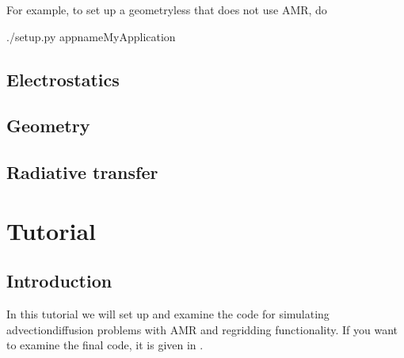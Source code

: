 \documentclass[letterpaper,10pt,english]{sphinxmanual}
\begin{document}
\sphinxAtStartPar
For example, to set up a geometry\sphinxhyphen{}less that does not use AMR, do

\begin{sphinxVerbatim}[commandchars=\\\{\},formatcom=\scriptsize]
 
./setup.py \PYGZhy{}app\PYGZus{}nameMyApplication
\end{sphinxVerbatim}

\sphinxstepscope


\section{Electrostatics}
\label{\detokenize{Applications/ElectrostaticsModel:electrostatics}}\label{\detokenize{Applications/ElectrostaticsModel:chap-electrostaticsmodel}}\label{\detokenize{Applications/ElectrostaticsModel::doc}}
\sphinxstepscope


\section{Geometry}
\label{\detokenize{Applications/GeometryModel:geometry}}\label{\detokenize{Applications/GeometryModel:chap-geometrymodel}}\label{\detokenize{Applications/GeometryModel::doc}}
\sphinxstepscope


\section{Radiative transfer}
\label{\detokenize{Applications/RadiativeTransferModel:radiative-transfer}}\label{\detokenize{Applications/RadiativeTransferModel:chap-radiativetransfermodel}}\label{\detokenize{Applications/RadiativeTransferModel::doc}}

\chapter{Tutorial}
\label{\detokenize{index:tutorial}}
\sphinxstepscope


\section{Introduction}
\label{\detokenize{Tutorials/Tutorial:introduction}}\label{\detokenize{Tutorials/Tutorial:chap-tutorial}}\label{\detokenize{Tutorials/Tutorial::doc}}
\sphinxAtStartPar
In this tutorial we will set up and examine the code for simulating advection\sphinxhyphen{}diffusion problems with AMR and regridding functionality.
If you want to examine the final code, it is given in .
\end{document}
